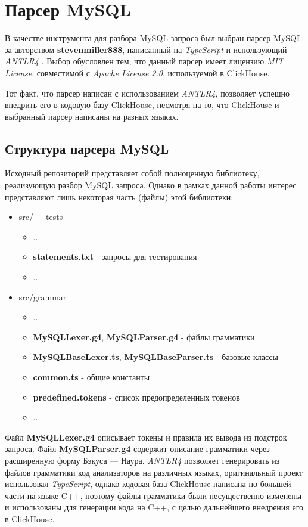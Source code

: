 \section{Парсер MySQL} \label{chap:mysql}
В качестве инструмента для разбора MySQL запроса был выбран парсер MySQL за авторством \textbf{stevenmiller888}, написанный на \textit{TypeScript} и использующий \textit{ANTLR4} \cite{mysql_parser}. Выбор обусловлен тем, что данный парсер имеет лицензию \textit{MIT License}, совместимой с \textit{Apache License 2.0}, используемой в ClickHouse.

Тот факт, что парсер написан с использованием \textit{ANTLR4}, позволяет успешно внедрить его в кодовую базу ClickHouse, несмотря на то, что ClickHouse и выбранный парсер написаны на разных языках.

\subsection{Структура парсера MySQL}
Исходный репозиторий представляет собой полноценную библиотеку, реализующую разбор MySQL запроса. Однако в рамках данной работы интерес представляют лишь некоторая часть (файлы) этой библиотеки:
\begin{itemize}
    \item src/\_\_tests\_\_
    \begin{itemize}
        \item ...
        \item \textbf{statements.txt} - запросы для тестирования
        \item ...
    \end{itemize}
    \item src/grammar
    \begin{itemize}
        \item ...
        \item \textbf{MySQLLexer.g4}, \textbf{MySQLParser.g4} - файлы грамматики
        \item \textbf{MySQLBaseLexer.ts}, \textbf{MySQLBaseParser.ts} - базовые классы
        \item \textbf{common.ts} - общие константы
        \item \textbf{predefined.tokens} - список предопределенных токенов
        \item ...
    \end{itemize}
\end{itemize}

\pagebreak

Файл \textbf{MySQLLexer.g4} описывает токены и правила их вывода из подстрок запроса. Файл \textbf{MySQLParser.g4} содержит описание грамматики через расширенную форму Бэкуса — Наура. \textit{ANTLR4} позволяет генерировать из файлов грамматики код анализаторов на различных языках, оригинальный проект использовал \textit{TypeScript}, однако кодовая база ClickHouse написана по большей части на языке C++, поэтому файлы грамматики были несущественно изменены и использованы для генерации кода на C++, с целью дальнейшего внедрения его в ClickHouse.


